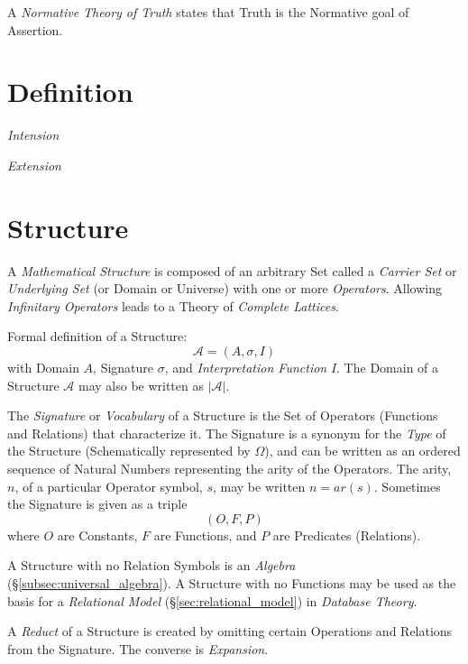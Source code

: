 \documentclass{article}
\begin{document}
A \emph{Normative Theory of Truth} states that Truth is the Normative
goal of Assertion.

\section{Definition}\label{sec:semantic_definition}

\emph{Intension}

\emph{Extension}

\section{Structure}\label{sec:mathematical_structure}

A \emph{Mathematical Structure} is composed of an arbitrary Set called
a \emph{Carrier Set} or \emph{Underlying Set} (or Domain or Universe)
with one or more \emph{Operators}. Allowing \emph{Infinitary
  Operators} leads to a Theory of \emph{Complete Lattices}.

Formal definition of a Structure:
\[
    \mathcal{A} = (A, \sigma, I)
\]
with Domain $A$, Signature $\sigma$, and \emph{Interpretation
  Function} $I$. The Domain of a Structure $\mathcal{A}$ may also be
written as $|\mathcal{A}|$.

The \emph{Signature} or \emph{Vocabulary} of a Structure is the Set of
Operators (Functions and Relations) that characterize it. The
Signature is a synonym for the \emph{Type} of the Structure
(Schematically represented by $\Omega$), and can be written as an
ordered sequence of Natural Numbers representing the arity of the
Operators. The arity, $n$, of a particular Operator symbol, $s$, may
be written $n=ar(s)$. Sometimes the Signature is given as a triple
\[
    (O,F,P)
\]
where $O$ are Constants, $F$ are Functions, and $P$ are Predicates
(Relations).

A Structure with no Relation Symbols is an \emph{Algebra}
(\S\ref{subsec:universal_algebra}). A Structure with no Functions may
be used as the basis for a \emph{Relational Model}
(\S\ref{sec:relational_model}) in \emph{Database Theory}.

A \emph{Reduct} of a Structure is created by omitting certain
Operations and Relations from the Signature. The converse is
\emph{Expansion}.
\end{document}
